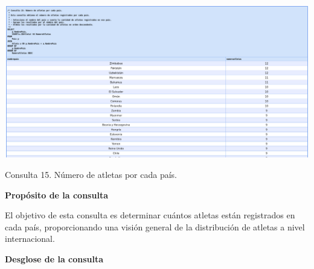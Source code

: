\begin{center}
    \includegraphics[width=16.5cm]{resources/Consulta15.jpeg} 
    
   Consulta 15. Número de atletas por cada país.
\end{center}

\textbf{Propósito de la consulta}

El objetivo de esta consulta es determinar cuántos atletas están registrados en cada país, proporcionando una visión general de la distribución de atletas a nivel internacional.

\textbf{Desglose de la consulta}

